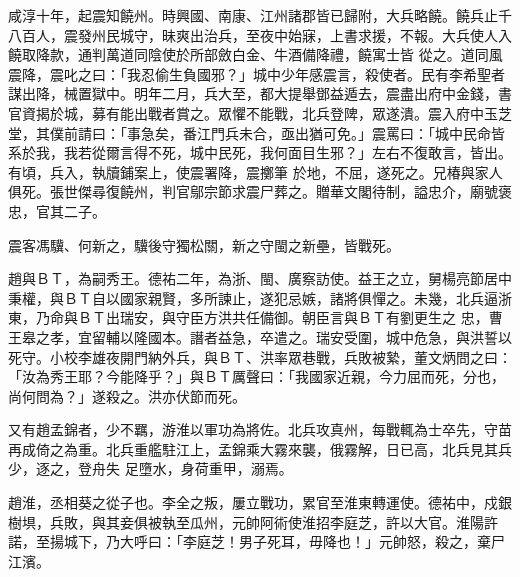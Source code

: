 \begin{pinyinscope}
 咸淳十年，起震知饒州。時興國、南康、江州諸郡皆已歸附，大兵略饒。饒兵止千八百人，震發州民城守，昧爽出治兵，至夜中始寐，上書求援，不報。大兵使人入饒取降款，通判萬道同陰使於所部斂白金、牛酒備降禮，饒寓士皆
 從之。道同風震降，震叱之曰：「我忍偷生負國邪？」城中少年感震言，殺使者。民有李希聖者謀出降，械置獄中。明年二月，兵大至，都大提舉鄧益遁去，震盡出府中金錢，書官資揭於城，募有能出戰者賞之。眾懼不能戰，北兵登陴，眾遂潰。震入府中玉芝堂，其僕前請曰：「事急矣，番江門兵未合，亟出猶可免。」震罵曰：「城中民命皆系於我，我若從爾言得不死，城中民死，我何面目生邪？」左右不復敢言，皆出。有頃，兵入，執牘鋪案上，使震署降，震擲筆
 於地，不屈，遂死之。兄椿與家人俱死。張世傑尋復饒州，判官鄔宗節求震尸葬之。贈華文閣待制，謚忠介，廟號褒忠，官其二子。



 震客馮驥、何新之，驥後守獨松關，新之守閩之新壘，皆戰死。



 趙與ＢＴ，為嗣秀王。德祐二年，為浙、閩、廣察訪使。益王之立，舅楊亮節居中秉權，與ＢＴ自以國家親賢，多所諫止，遂犯忌嫉，諸將俱憚之。未幾，北兵逼浙東，乃命與ＢＴ出瑞安，與守臣方洪共任備御。朝臣言與ＢＴ有劉更生之
 忠，曹王皋之孝，宜留輔以隆國本。譖者益急，卒遣之。瑞安受圍，城中危急，與洪誓以死守。小校李雄夜開門納外兵，與ＢＴ、洪率眾巷戰，兵敗被縶，董文炳問之曰：「汝為秀王耶？今能降乎？」與ＢＴ厲聲曰：「我國家近親，今力屈而死，分也，尚何問為？」遂殺之。洪亦伏節而死。



 又有趙孟錦者，少不羈，游淮以軍功為將佐。北兵攻真州，每戰輒為士卒先，守苗再成倚之為重。北兵重艦駐江上，孟錦乘大霧來襲，俄霧解，日已高，北兵見其兵少，逐之，登舟失
 足墮水，身荷重甲，溺焉。



 趙淮，丞相葵之從子也。李全之叛，屢立戰功，累官至淮東轉運使。德祐中，戍銀樹埧，兵敗，與其妾俱被執至瓜州，元帥阿術使淮招李庭芝，許以大官。淮陽許諾，至揚城下，乃大呼曰：「李庭芝！男子死耳，毋降也！」元帥怒，殺之，棄尸江濱。



\end{pinyinscope}